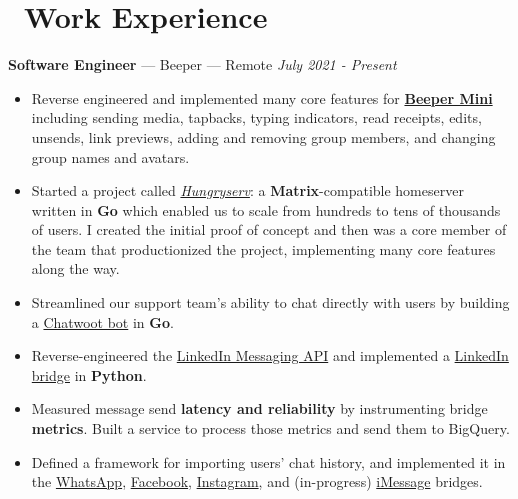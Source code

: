 \documentclass[10pt,letterpaper]{article}
\begin{document}
\section*{\faBriefcase\ Work Experience}
{\fontsize{11}{0}
\textbf{Software Engineer} --- Beeper --- Remote}
\hfill \textit{July 2021 - Present}
\begin{itemize}
    \item Reverse engineered and implemented many core features for
        \href{https://blog.beeper.com/p/introducing-beeper-mini-get-blue}{\textbf{Beeper Mini}}
        including sending media, tapbacks, typing indicators, read receipts,
        edits, unsends, link previews, adding and removing group members, and
        changing group names and avatars.
    \item Started a project called
        \href{https://github.com/sumnerevans/hungryserv-presentation}{\textit{Hungryserv}}:
        a \textbf{Matrix}-compatible homeserver written in \textbf{Go}
        which enabled us to scale from hundreds to tens of thousands of users.
        I created the initial proof of concept and then was a core member of the
        team that productionized the project, implementing many core features
        along the way.
    \item Streamlined our support team's ability to chat directly with users by
        building a
        \href{https://github.com/beeper/chatwoot}{Chatwoot bot} in
        \textbf{Go}.
    \item Reverse-engineered the
        \href{https://github.com/beeper/linkedin-messaging-api}{LinkedIn Messaging API}
        and implemented a
        \href{https://github.com/beeper/linkedin}{LinkedIn bridge} in
        \textbf{Python}.
    \item Measured message send \textbf{latency and reliability} by
        instrumenting bridge \textbf{metrics}. Built a service to process those
        metrics and send them to BigQuery.
    \item Defined a framework for importing users' chat history, and
        implemented it in the
        \href{https://github.com/mautrix/whatsapp}{WhatsApp},
        \href{https://github.com/mautrix/facebook}{Facebook},
        \href{https://github.com/mautrix/instagram}{Instagram}, and
        (in-progress) \href{https://github.com/mautrix/imessage}{iMessage} bridges.
\end{itemize}
\end{document}
